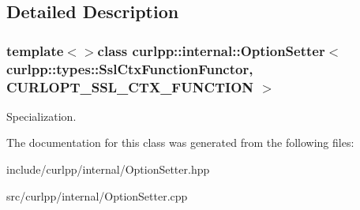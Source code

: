 \subsection{Detailed Description}
\subsubsection*{template$<$$>$class curlpp\-::internal\-::\-Option\-Setter$<$ curlpp\-::types\-::\-Ssl\-Ctx\-Function\-Functor, C\-U\-R\-L\-O\-P\-T\-\_\-\-S\-S\-L\-\_\-\-C\-T\-X\-\_\-\-F\-U\-N\-C\-T\-I\-O\-N $>$}

Specialization. 

The documentation for this class was generated from the following files\-:\begin{DoxyCompactItemize}
\item 
include/curlpp/internal/Option\-Setter.\-hpp\item 
src/curlpp/internal/Option\-Setter.\-cpp\end{DoxyCompactItemize}
